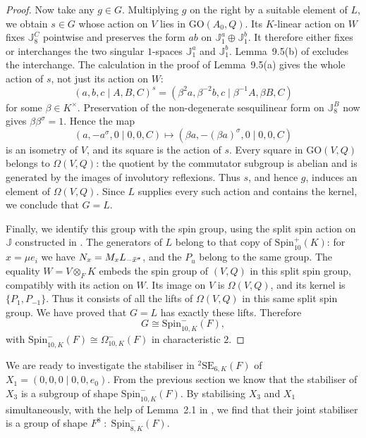 \documentclass{amsart}
\def\ovx{\mathord{\mbox{\hspace*{0pt}}\,\overline{\!x\!\!\;}\!\:}\mbox{\hspace*{0pt}}}
\def\cn{\mathord{{\;\!{:}\;\!}}}
\newcommand{\GO}{\mathrm{GO}}
\newcommand{\SE}{\mathrm{SE}}
\newcommand{\Spin}{\mathrm{Spin}}
\newcommand{\J}{\mathbb{J}}
\newcommand{\s}{\sigma}
\theoremstyle{plain}
\numberwithin{theorem}{section}
\theoremstyle{definition}
\begin{document}
\begin{proof}
	Now take any $g\in G$. Multiplying $g$ on the right by a suitable
	element of $L$, we obtain $s\in G$ whose action on $V$ lies in
	$\GO(A_0,Q)$. Its $K$-linear action on $W$ fixes $\J_8^C$
	pointwise and preserves the form $ab$ on $\J_1^a\oplus\J_1^b$.
	It therefore either fixes or interchanges the two singular
	$1$-spaces $\J_1^a$ and $\J_1^b$.
	Lemma~9.5(b) of \cite{BSW1} excludes the interchange.
	The calculation in the proof of Lemma~9.5(a) gives the whole
	action of $s$, not just its action on $W$:
	\[
		(a,b,c\mid A,B,C)^s
		=(\beta^2a,\beta^{-2}b,c\mid\beta^{-1}A,\beta B,C)
	\]
	for some $\beta\in K^\times$.
	Preservation of the non-degenerate sesquilinear form on $\J_8^B$
	now gives $\beta\beta^{\s}=1$.
	Hence the map
	\[
		(a,-a^{\s},0\mid0,0,C)
		\longmapsto(\beta a,-(\beta a)^{\s},0\mid0,0,C)
	\]
	is an isometry of $V$, and its square is the action of $s$.
	Every square in $\GO(V,Q)$ belongs to $\Omega(V,Q)$:
	the quotient by the commutator subgroup is abelian and is
	generated by the images of involutory reflexions.
	Thus $s$, and hence $g$, induces an element of $\Omega(V,Q)$.
	Since $L$ supplies every such action and contains the kernel,
	we conclude that $G=L$.

	Finally, we identify this group with the spin group, using the
	split spin action on $\J$ constructed in \cite[Theorem~9.6]{BSW1}.
	The generators of $L$ belong to that copy of $\Spin_{10}^{+}(K)$:
	for $x=\mu e_i$ we have $N_x=M_xL_{-\ovx^{\s}}$, and the $P_u$
	belong to the same group. The equality $W=V\otimes_F K$ embeds
	the spin group of $(V,Q)$ in this split spin group, compatibly
	with its action on $W$. Its image on $V$ is $\Omega(V,Q)$,
	and its kernel is $\{P_1,P_{-1}\}$. Thus it consists of all the
	lifts of $\Omega(V,Q)$ in this same split spin group.
	We have proved that $G=L$ has exactly these lifts. Therefore
	\[
		G\cong\Spin_{10,K}^{-}(F),
	\]
	with $\Spin_{10,K}^{-}(F)\cong\Omega_{10,K}^{-}(F)$ in
	characteristic $2$.
\end{proof}

We are ready to investigate the stabiliser in ${}^2\SE_{6,K}(F)$ of 
\mbox{$X_1 = (0,0,0\mid 0,0,e_0)$}. From the previous section we know that the stabiliser of 
$X_3$ is a subgroup of shape $\Spin_{10,K}^{-}(F)$. By stabilising $X_3$ and $X_1$ simultaneously,
with the help of Lemma~2.1 in \cite{BSW1}, we find that their joint stabiliser is a group
of shape $F^8\cn\Spin_{8,K}^{-}(F)$.
\end{document}
